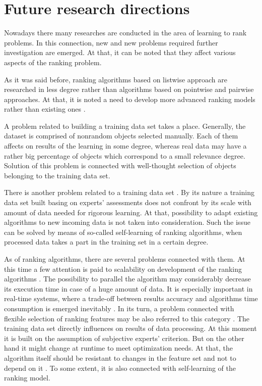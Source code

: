 \documentclass[12pt,a4paper,oneside]{article}
\begin{document}

\section{Future research directions}
\label{sec:future_research_directions}

\par
Nowadays there many researches are conducted in the area of learning to rank problems. 
In this connection, new and new problems required further investigation are emerged. 
At that, it can be noted that they affect various aspects of the ranking problem.

\par
As it was said before, ranking algorithms based on listwise approach are researched in less degree rather than algorithms based on pointwise and pairwise approaches. 
At that, it is noted a need to develop more advanced ranking models rather than existing ones . 

\par
A problem related to building a training data set takes a place. 
Generally, the dataset is comprised of nonrandom objects selected manually. 
Each of them affects on results of the learning in some degree, whereas real data may have a rather big percentage of objects which correspond to a small relevance degree. 
Solution of this problem is connected with well-thought selection of objects belonging to the training data set.

\par
There is another problem related to a training data set . 
By its nature a training data set built basing on experts' assessments does not confront by its scale with amount of data needed for rigorous learning. 
At that, possibility to adapt existing algorithms to new incoming data is not taken into consideration. 
Such the issue can be solved by means of so-called self-learning of ranking algorithms, when processed data takes a part in the training set in a certain degree.

\par
As of ranking algorithms, there are several problems connected with them. 
At this time a few attention is paid to scalability on development of the ranking algorithms . 
The possibility to parallel the algorithm may considerably decrease its execution time in case of a huge amount of data. 
It is especially important in real-time systems, where a trade-off between results accuracy and algorithms time consumption is emerged inevitably . 
In its turn, a problem connected with flexible selection of ranking features may be also referred to this category . 
The training data set directly influences on results of data processing. 
At this moment it is built on the assumption of subjective experts' criterion. 
But on the other hand it might change at runtime to meet optimization needs. 
At that, the algorithm itself should be resistant to changes in the feature set and not to depend on it . 
To some extent, it is also connected with self-learning of the ranking model.
\end{document}
